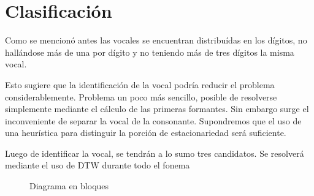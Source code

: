 \documentclass[a4paper]{article}
\begin{document}
	\section{Clasificación}
		Como se mencionó antes las vocales se encuentran distribuídas en los dígitos, no hallándose más de una por dígito
		y no teniendo más de tres dígitos la misma vocal.

		Esto sugiere que la identificación de la vocal podría reducir el problema considerablemente. 
		Problema un poco más sencillo, posible de resolverse simplemente mediante el cálculo de las primeras formantes.
		Sin embargo surge el inconveniente de separar la vocal de la consonante. 
		Supondremos que el uso de una heurística para distinguir la porción de estacionariedad será suficiente.

		Luego de identificar la vocal, se tendrán a lo sumo tres candidatos. 
		Se resolverá mediante el uso de DTW durante todo el fonema

		\begin{figure}
			
			\caption{Diagrama en bloques}
		\end{figure}

		
	
\end{document}
